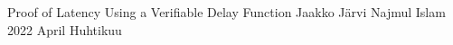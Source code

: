\documentclass[a4paper,12pt]{report}
\begin{document}

\renewcommand{\appname}{Appendices}

{Proof of Latency Using a Verifiable Delay Function}
{Jaakko Järvi}
{Najmul Islam}
{2022}
{April}
{Huhtikuu}


\gentitle



%
%
\pagestyle{empty}


%
%
\tableofcontents
\clearpage
\setcounter{page}{0}
\listoffigures
\clearpage
\setcounter{page}{0}
\lstlistoflistings

%
%
%

\startpages
\end{document}
